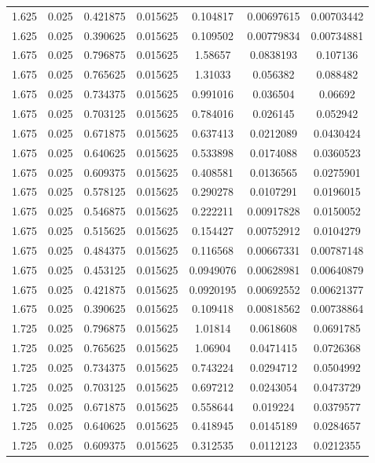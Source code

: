 \begin{flushleft}
\begin{longtable}{ccccccc}
1.625 & 0.025 & 0.421875 & 0.015625 & 0.104817 & 0.00697615 & 0.00703442  \\ 
1.625 & 0.025 & 0.390625 & 0.015625 & 0.109502 & 0.00779834 & 0.00734881  \\ 
1.675 & 0.025 & 0.796875 & 0.015625 & 1.58657 & 0.0838193 & 0.107136  \\ 
1.675 & 0.025 & 0.765625 & 0.015625 & 1.31033 & 0.056382 & 0.088482  \\ 
1.675 & 0.025 & 0.734375 & 0.015625 & 0.991016 & 0.036504 & 0.06692  \\ 
1.675 & 0.025 & 0.703125 & 0.015625 & 0.784016 & 0.026145 & 0.052942  \\ 
1.675 & 0.025 & 0.671875 & 0.015625 & 0.637413 & 0.0212089 & 0.0430424  \\ 
1.675 & 0.025 & 0.640625 & 0.015625 & 0.533898 & 0.0174088 & 0.0360523  \\ 
1.675 & 0.025 & 0.609375 & 0.015625 & 0.408581 & 0.0136565 & 0.0275901  \\ 
1.675 & 0.025 & 0.578125 & 0.015625 & 0.290278 & 0.0107291 & 0.0196015  \\ 
1.675 & 0.025 & 0.546875 & 0.015625 & 0.222211 & 0.00917828 & 0.0150052  \\ 
1.675 & 0.025 & 0.515625 & 0.015625 & 0.154427 & 0.00752912 & 0.0104279  \\ 
1.675 & 0.025 & 0.484375 & 0.015625 & 0.116568 & 0.00667331 & 0.00787148  \\ 
1.675 & 0.025 & 0.453125 & 0.015625 & 0.0949076 & 0.00628981 & 0.00640879  \\ 
1.675 & 0.025 & 0.421875 & 0.015625 & 0.0920195 & 0.00692552 & 0.00621377  \\ 
1.675 & 0.025 & 0.390625 & 0.015625 & 0.109418 & 0.00818562 & 0.00738864  \\ 
1.725 & 0.025 & 0.796875 & 0.015625 & 1.01814 & 0.0618608 & 0.0691785  \\ 
1.725 & 0.025 & 0.765625 & 0.015625 & 1.06904 & 0.0471415 & 0.0726368  \\ 
1.725 & 0.025 & 0.734375 & 0.015625 & 0.743224 & 0.0294712 & 0.0504992  \\ 
1.725 & 0.025 & 0.703125 & 0.015625 & 0.697212 & 0.0243054 & 0.0473729  \\ 
1.725 & 0.025 & 0.671875 & 0.015625 & 0.558644 & 0.019224 & 0.0379577  \\ 
1.725 & 0.025 & 0.640625 & 0.015625 & 0.418945 & 0.0145189 & 0.0284657  \\ 
1.725 & 0.025 & 0.609375 & 0.015625 & 0.312535 & 0.0112123 & 0.0212355  \\ 

\end{longtable}
\end{flushleft}
